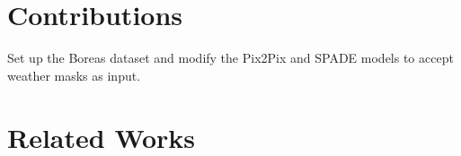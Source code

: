 \section{Contributions}
Set up the Boreas dataset and modify the Pix2Pix and SPADE models to accept weather masks as input.
\section{Related Works}